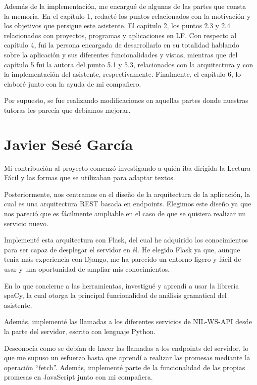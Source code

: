 Además de la implementación, me encargué de algunas de las partes que consta la memoria. En el capítulo 1, redacté los puntos relacionados con la motivación y los objetivos que persigue este asistente. El capítulo 2, los puntos 2.3 y 2.4 relacionados con proyectos, programas y aplicaciones en LF. Con respecto al capítulo 4, fui la persona encargada de desarrollarlo en su totalidad hablando sobre la aplicación y sus diferentes funcionalidades y vistas, mientras que del capítulo 5 fui la autora del punto 5.1 y 5.3, relacionados con la arquitectura y con la implementación del asistente, respectivamente. Finalmente, el capítulo 6, lo elaboré junto con la ayuda de mi compañero.

Por supuesto, se fue realizando modificaciones en aquellas partes donde nuestras tutoras les parecía que debíamos mejorar.

\section{Javier Sesé García}

Mi contribución al proyecto comenzó investigando a quién iba dirigida la Lectura Fácil y las formas que se utilizaban para adaptar textos. 

Posteriormente, nos centramos en el diseño de la arquitectura de la aplicación, la cual es una arquitectura REST basada en endpoints. Elegimos este diseño ya que nos pareció que es fácilmente ampliable en el caso de que se quisiera realizar un servicio nuevo.

Implementé esta arquitectura con Flask, del cual he adquirido los conocimientos para ser capaz de desplegar el servidor en él. He elegido Flask ya que, aunque tenia más experiencia con Django, me ha parecido un entorno ligero y fácil de usar y una oportunidad de ampliar mis conocimientos.

En lo que concierne a las herramientas, investigué y aprendí a usar la librería spaCy, la cual otorga la principal funcionalidad de análisis gramatical del asistente. 


Además, implementé las llamadas a los diferentes servicios de NIL-WS-API desde la parte del servidor, escrito con lenguaje Python.

Desconocía como se debían de hacer las llamadas a los endpoints del servidor, lo que me supuso un esfuerzo hasta que aprendí a realizar las promesas mediante la operación ``fetch''. Además, implementé parte de la funcionalidad de las propias promesas en JavaScript junto con mi compañera.


